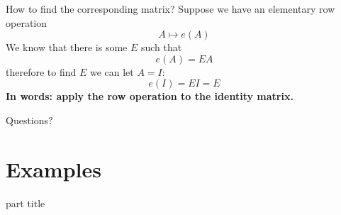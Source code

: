 \documentclass{beamer}
\begin{document}
\begin{frame}{How to find the corresponding matrix?}
  Suppose we have an elementary row operation
  \begin{equation*}
    A\mapsto e(A)
  \end{equation*}
  We know that there is some $E$ such that
  \begin{equation*}
    e(A) = EA
  \end{equation*}
  therefore to find $E$ we can let $A=I$:
  \begin{equation*}
    e(I) = EI = E
  \end{equation*}
  \bf{In words: apply the row operation to the identity matrix.}
\end{frame}

\begin{frame}
  Questions?
\end{frame}

\section{Examples}

\begin{frame}
  \begin{beamercolorbox}[sep=12pt,center]{part title}
    \insertsection\par
  \end{beamercolorbox}
\end{frame}
\end{document}
